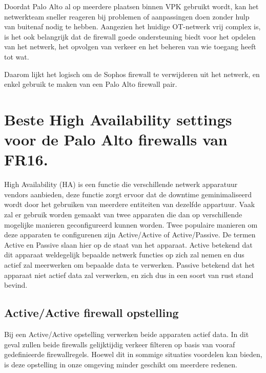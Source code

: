 Doordat Palo Alto al op meerdere plaatsen binnen VPK gebruikt wordt, kan het netwerkteam sneller reageren bij problemen of aanpassingen doen zonder hulp van buitenaf nodig te hebben. Aangezien het huidige OT-netwerk vrij complex is, is het ook belangrijk dat de firewall goede ondersteuning biedt voor het opdelen van het netwerk, het opvolgen van verkeer en het beheren van wie toegang heeft tot wat.

Daarom lijkt het logisch om de Sophos firewall te verwijderen uit het netwerk, en enkel gebruik te maken van een Palo Alto firewall pair.

\newpage

\section{Beste High Availability settings voor de Palo Alto firewalls van FR16.}


High Availability (HA) is een functie die verschillende netwerk apparatuur vendors aanbieden, deze functie zorgt ervoor dat de downtime geminimaliseerd wordt door het gebruiken van meerdere entiteiten van dezelfde appartuur. Vaak zal er gebruik worden gemaakt van twee apparaten die dan op verschillende mogelijke manieren geconfigureerd kunnen worden. Twee populaire manieren om deze apparaten te configurenen zijn Active/Active of Active/Passive. De termen Active en Passive slaan hier op de staat van het apparaat. Active betekend dat dit apparaat weldegelijk bepaalde netwerk functies op zich zal nemen en dus actief zal meerwerken om bepaalde data te verwerken. Passive betekend dat het apparaat niet actief data zal verwerken, en zich dus in een soort van rust stand bevind.

\subsection{Active/Active firewall opstelling}
Bij een Active/Active opstelling verwerken beide apparaten actief data. In dit geval zullen beide firewalls gelijktijdig verkeer filteren op basis van vooraf gedefinieerde firewallregels. Hoewel dit in sommige situaties voordelen kan bieden, is deze opstelling in onze omgeving minder geschikt om meerdere redenen.


